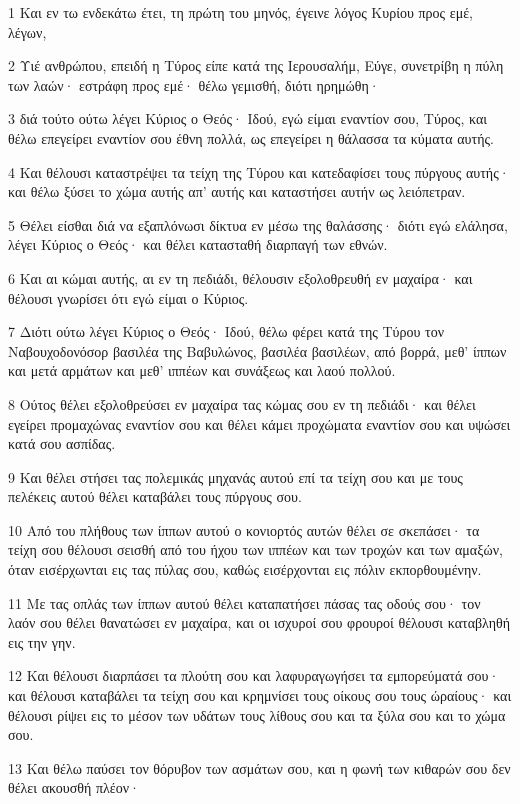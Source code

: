 \par 1 Και εν τω ενδεκάτω έτει, τη πρώτη του μηνός, έγεινε λόγος Κυρίου προς εμέ, λέγων,
\par 2 Υιέ ανθρώπου, επειδή η Τύρος είπε κατά της Ιερουσαλήμ, Εύγε, συνετρίβη η πύλη των λαών· εστράφη προς εμέ· θέλω γεμισθή, διότι ηρημώθη·
\par 3 διά τούτο ούτω λέγει Κύριος ο Θεός· Ιδού, εγώ είμαι εναντίον σου, Τύρος, και θέλω επεγείρει εναντίον σου έθνη πολλά, ως επεγείρει η θάλασσα τα κύματα αυτής.
\par 4 Και θέλουσι καταστρέψει τα τείχη της Τύρου και κατεδαφίσει τους πύργους αυτής· και θέλω ξύσει το χώμα αυτής απ' αυτής και καταστήσει αυτήν ως λειόπετραν.
\par 5 Θέλει είσθαι διά να εξαπλόνωσι δίκτυα εν μέσω της θαλάσσης· διότι εγώ ελάλησα, λέγει Κύριος ο Θεός· και θέλει κατασταθή διαρπαγή των εθνών.
\par 6 Και αι κώμαι αυτής, αι εν τη πεδιάδι, θέλουσιν εξολοθρευθή εν μαχαίρα· και θέλουσι γνωρίσει ότι εγώ είμαι ο Κύριος.
\par 7 Διότι ούτω λέγει Κύριος ο Θεός· Ιδού, θέλω φέρει κατά της Τύρου τον Ναβουχοδονόσορ βασιλέα της Βαβυλώνος, βασιλέα βασιλέων, από βορρά, μεθ' ίππων και μετά αρμάτων και μεθ' ιππέων και συνάξεως και λαού πολλού.
\par 8 Ούτος θέλει εξολοθρεύσει εν μαχαίρα τας κώμας σου εν τη πεδιάδι· και θέλει εγείρει προμαχώνας εναντίον σου και θέλει κάμει προχώματα εναντίον σου και υψώσει κατά σου ασπίδας.
\par 9 Και θέλει στήσει τας πολεμικάς μηχανάς αυτού επί τα τείχη σου και με τους πελέκεις αυτού θέλει καταβάλει τους πύργους σου.
\par 10 Από του πλήθους των ίππων αυτού ο κονιορτός αυτών θέλει σε σκεπάσει· τα τείχη σου θέλουσι σεισθή από του ήχου των ιππέων και των τροχών και των αμαξών, όταν εισέρχωνται εις τας πύλας σου, καθώς εισέρχονται εις πόλιν εκπορθουμένην.
\par 11 Με τας οπλάς των ίππων αυτού θέλει καταπατήσει πάσας τας οδούς σου· τον λαόν σου θέλει θανατώσει εν μαχαίρα, και οι ισχυροί σου φρουροί θέλουσι καταβληθή εις την γην.
\par 12 Και θέλουσι διαρπάσει τα πλούτη σου και λαφυραγωγήσει τα εμπορεύματά σου· και θέλουσι καταβάλει τα τείχη σου και κρημνίσει τους οίκους σου τους ώραίους· και θέλουσι ρίψει εις το μέσον των υδάτων τους λίθους σου και τα ξύλα σου και το χώμα σου.
\par 13 Και θέλω παύσει τον θόρυβον των ασμάτων σου, και η φωνή των κιθαρών σου δεν θέλει ακουσθή πλέον·
